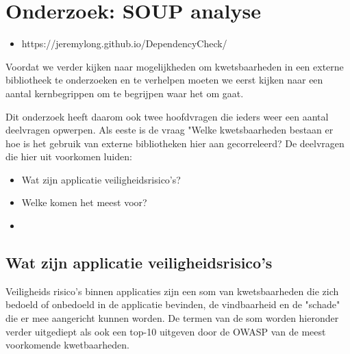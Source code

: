 
\chapter{Onderzoek: SOUP analyse}\label{ch:onderzoek:-soup-analyse} %

\begin{itemize}
\item https://jeremylong.github.io/DependencyCheck/
\end{itemize}

Voordat we verder kijken naar mogelijkheden om kwetsbaarheden in een externe bibliotheek te onderzoeken en te verhelpen moeten we eerst kijken naar een aantal kernbegrippen om te begrijpen waar het om gaat.

Dit onderzoek heeft daarom ook twee hoofdvragen die ieders weer een aantal deelvragen opwerpen.
Als eeste is de vraag "Welke kwetsbaarheden bestaan er hoe is het gebruik van externe bibliotheken hier aan gecorreleerd?
De deelvragen die hier uit voorkomen luiden:
\begin{itemize}
  \item Wat zijn applicatie veiligheidsrisico's?
  \item Welke komen het meest voor?
  \item
\end{itemize}

\section{Wat zijn applicatie veiligheidsrisico's}\label{sec:wat-zijn-applicatie-veiligheids-risico's}
Veiligheids risico's binnen applicaties zijn een som van kwetsbaarheden die zich bedoeld of onbedoeld in de applicatie bevinden, de vindbaarheid en de "schade" die er mee aangericht kunnen worden.
De termen van de som worden hieronder verder uitgediept als ook een top-10 uitgeven door de OWASP van de meest voorkomende kwetbaarheden.

